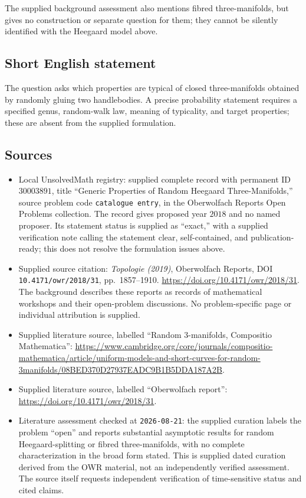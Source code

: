 \documentclass[11pt]{article}
\begin{document}
The supplied background assessment also mentions fibred three-manifolds, but gives no construction or separate question for them; they cannot be silently identified with the Heegaard model above.
\subsection{Short English statement}
The question asks which properties are typical of closed three-manifolds obtained by randomly gluing two handlebodies. A precise probability statement requires a specified genus, random-walk law, meaning of typicality, and target properties; these are absent from the supplied formulation.
\subsection{Sources}
\begin{itemize}
\item Local UnsolvedMath registry: supplied complete record with permanent ID \(30003891\), title ``Generic Properties of Random Heegaard Three-Manifolds,'' source problem code \texttt{catalogue entry}, in the Oberwolfach Reports Open Problems collection. The record gives proposed year \(2018\) and no named proposer. Its statement status is supplied as ``exact,'' with a supplied verification note calling the statement clear, self-contained, and publication-ready; this does not resolve the formulation issues above.
\item Supplied source citation: \emph{Topologie (2019)}, Oberwolfach Reports, DOI \texttt{10.4171/owr/2018/31}, pp.\ 1857--1910. \url{https://doi.org/10.4171/owr/2018/31}. The background describes these reports as records of mathematical workshops and their open-problem discussions. No problem-specific page or individual attribution is supplied.
\item Supplied literature source, labelled ``Random 3-manifolds, Compositio Mathematica'': \url{https://www.cambridge.org/core/journals/compositio-mathematica/article/uniform-models-and-short-curves-for-random-3manifolds/08BED370D27937EADC9B1B5DDA187A2B}.
\item Supplied literature source, labelled ``Oberwolfach report'': \url{https://doi.org/10.4171/owr/2018/31}.
\item Literature assessment checked at \texttt{2026-08-21}: the supplied curation labels the problem ``open'' and reports substantial asymptotic results for random Heegaard-splitting or fibred three-manifolds, with no complete characterization in the broad form stated. This is supplied dated curation derived from the OWR material, not an independently verified assessment. The source itself requests independent verification of time-sensitive status and cited claims.
\end{itemize}
\end{document}
